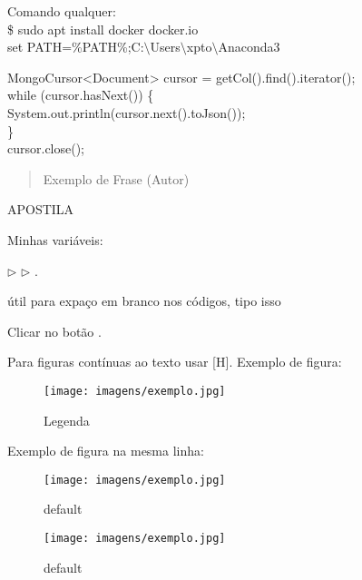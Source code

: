 \documentclass[a4paper,11pt]{article}
\begin{document}
Comando qualquer: \\
{\ttfamily\$ sudo apt install docker docker.io} \\
{\ttfamily set PATH=\%PATH\%;C:$\setminus$Users$\setminus$xpto$\setminus$Anaconda3}

{\ttfamily MongoCursor<Document> cursor = getCol().find().iterator(); \\
	while (cursor.hasNext()) \{ \\
	\phantom{x}\hspace{4pt} System.out.println(cursor.next().toJson()); \\
	\} \\
	cursor.close(); }

\begin{quotation}
	Exemplo de Frase (Autor)
\end{quotation}

APOSTILA

\begin{theo}[]{}
	\lipsum[4-1]
\end{theo}

\begin{theo}{}
	\lipsum[4-1]
\end{theo}

Minhas variáveis:

 $\triangleright$  $\triangleright$ .

\aspas{ } útil para expaço em branco nos códigos, tipo isso


Clicar no botão .

Para figuras contínuas ao texto usar [H]. Exemplo de figura:
\begin{figure}[H]
	\centering
	\texttt{[image: imagens/exemplo.jpg]}
	\caption{Legenda}
\end{figure}

Exemplo de figura na mesma linha:

\begin{figure}[ht]
	\begin{minipage}[b]{0.45\linewidth}
		\centering
		\texttt{[image: imagens/exemplo.jpg]}
		\caption{default}
		\label{fig:figure1}
	\end{minipage}
	\hspace{0.5cm}
	\begin{minipage}[b]{0.45\linewidth}
		\centering
		\texttt{[image: imagens/exemplo.jpg]}
		\caption{default}
		\label{fig:figure2}
	\end{minipage}
\end{figure}
\end{document}

